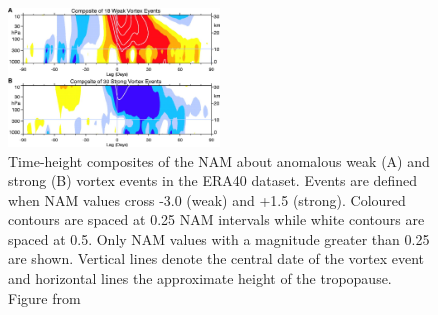 \begin{figure}[h!]
\centering
    \includegraphics[width=0.5\textwidth]{Figures/Figures-background/baldwin_composite.jpg}
    \caption[Time-height composites of the NAM about anomalous vortex events in the ERA40 dataset from \cite{baldwinStratospheric2001a}.]{Time-height composites of the NAM about anomalous weak (A) and strong (B) vortex events in the ERA40 dataset. Events are defined when NAM values cross -3.0 (weak) and +1.5 (strong). Coloured contours are spaced at 0.25 NAM intervals while white contours are spaced at 0.5. Only NAM values with a magnitude greater than 0.25 are shown. Vertical lines denote the central date of the vortex event and horizontal lines the approximate height of the tropopause. Figure from \cite{baldwinStratospheric2001a}}  
    \label{fig:Baldwin_composite}
\centering
\end{figure}

